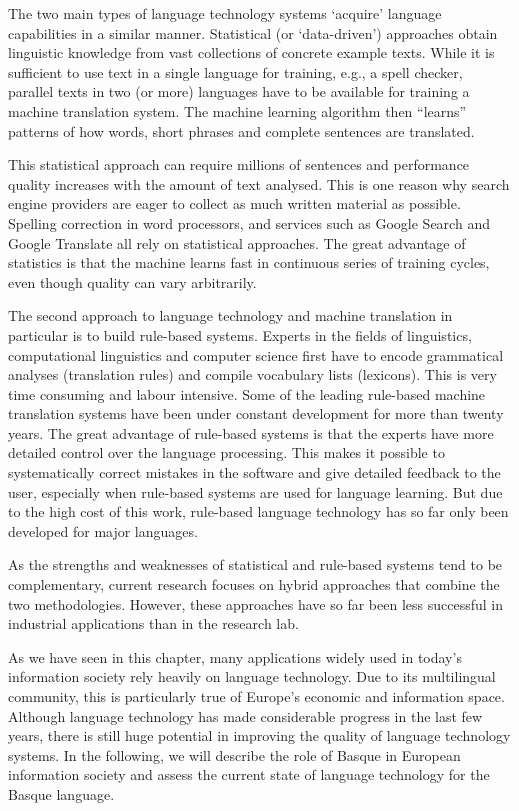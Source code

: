 \begin{multicols}{2}
    The two main types of language technology systems ‘acquire’ language capabilities in a similar manner. Statistical (or ‘data-driven’) approaches obtain linguistic knowledge from vast collections of concrete example texts. While it is sufficient to use text in a single language for training, e.g., a spell checker, parallel texts in two (or more) languages have to be available for training a machine translation system. The machine learning algorithm then “learns” patterns of how words, short phrases and complete sentences are translated. 

    This statistical approach can require millions of sentences and performance quality increases with the amount of text analysed. This is one reason why search engine providers are eager to collect as much written material as possible. Spelling correction in word processors, and services such as Google Search and Google Translate all rely on statistical approaches. The great advantage of statistics is that the machine learns fast in continuous series of training cycles, even though quality can vary arbitrarily.

    The second approach to language technology and machine translation in particular is to build rule-based systems. Experts in the fields of linguistics, computational linguistics and computer science first have to encode grammatical analyses (translation rules) and compile vocabulary lists (lexicons). This is very time consuming and labour intensive. Some of the leading rule-based machine translation systems have been under constant development for more than twenty years. The great advantage of rule-based systems is that the experts have more detailed control over the language processing. This makes it possible to systematically correct mistakes in the software and give detailed feedback to the user, especially when rule-based systems are used for language learning. But due to the high cost of this work, rule-based language technology has so far only been developed for major languages. 

    As the strengths and weaknesses of statistical and rule-based systems tend to be complementary, current research focuses on hybrid approaches that combine the two methodologies. However, these approaches have so far been less successful in industrial applications than in the research lab. 

    As we have seen in this chapter, many applications widely used in today’s information society rely heavily on language technology. Due to its multilingual community, this is particularly true of Europe’s economic and information space. Although language technology has made considerable progress in the last few years, there is still huge potential in improving the quality of language technology systems. In the following, we will describe the role of Basque in European information society and assess the current state of language technology for the Basque language.
\end{multicols}


